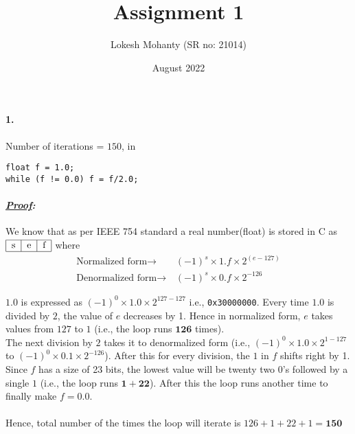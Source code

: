 \documentclass[12pt, letterpaper]{article}
\title{Assignment 1}
\author{Lokesh Mohanty (SR no: 21014)}
\date{August 2022}
\begin{document}
\maketitle

\paragraph{1.} Number of iterations = $150$, in
\begin{verbatim}
float f = 1.0;
while (f != 0.0) f = f/2.0;
\end{verbatim}

\paragraph{\textit{\underline{Proof}:}}

We know that as per IEEE 754 standard a real number(float) is stored in C as
$\begin{tabular}{ |c|c|c| } \hline s&e&f\\ \hline \end{tabular}$ where
\[\begin{split}
\text{Normalized form} \to\, &(-1)^s \times 1.f \times 2^{(e - 127)}\\
\text{Denormalized form} \to\, &(-1)^s \times 0.f \times 2^{-126}
\end{split}\]

$1.0$ is expressed as $(-1)^0 \times 1.0 \times 2^{127 - 127}$ i.e., \verb+0x30000000+.
Every time $1.0$ is divided by $2$, the value of $e$ decreases by 1.
Hence in normalized form, $e$ takes values from $127$ to $1$ (i.e., the loop runs $\mathbf{126}$ times).\\

The next division by $2$ takes it to denormalized form (i.e., $(-1)^0 \times 1.0 \times 2^{1 - 127}$ to $(-1)^0 \times 0.1 \times 2^{-126}$). After this for every division, the $1$ in $f$ shifts right by 1. Since $f$ has a size of 23 bits, the lowest value will be twenty two $0$'s followed by a single $1$ (i.e., the loop runs $\mathbf{1} + \mathbf{22}$). After this the loop runs another time to finally make $f = 0.0$.\\\\
Hence, total number of the times the loop will iterate is $\boxed{126 + 1 + 22 + 1 = \mathbf{150}}$

\pagebreak
\end{document}
